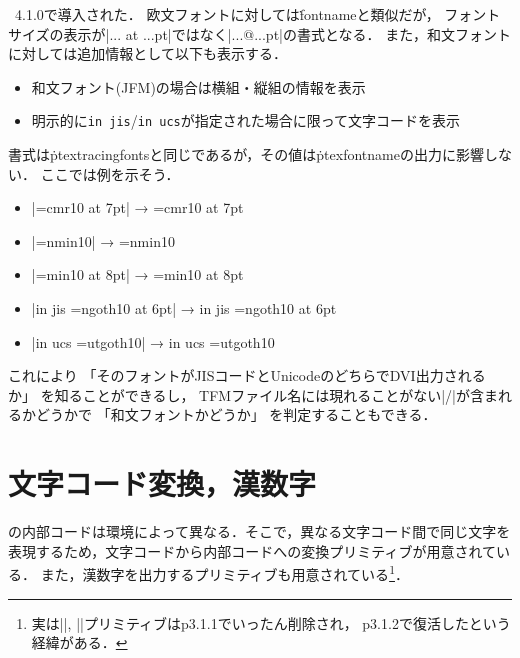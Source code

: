 \documentclass[a4paper,11pt,nomag,dvipdfmx]{jsarticle}
\def\code#1{\texttt{#1}}
\begin{document}
\begin{cslist}
\csitem[\.{ptexfontname}]
  \pTeX~4.1.0で導入された．
  欧文フォントに対しては\.{fontname}と類似だが，
  フォントサイズの表示が|... at ...pt|ではなく|...@...pt|の書式となる．
  また，和文フォントに対しては追加情報として以下も表示する．
   \begin{itemize}
    \item 和文フォント(JFM)の場合は横組・縦組の情報を表示
    \item 明示的に\verb+in jis+/\verb+in ucs+が指定された場合に限って文字コードを表示
   \end{itemize}
  書式は\.{ptextracingfonts}と同じであるが，その値は\.{ptexfontname}の出力に影響しない．
  ここでは例を示そう．
 \begin{itemize}
  \item |\font\x=cmr10 at 7pt| → {\font\x=cmr10 at 7pt \code{\ptexfontname\x}}
  \item |\font\x=nmin10| → {\font\x=nmin10 \code{\ptexfontname\x}}
  \item |\font\x=min10 at 8pt| → {\font\x=min10 at 8pt \code{\ptexfontname\x}}
  \item |\font in jis \x=ngoth10 at 6pt| → {\font in jis \x=ngoth10 at 6pt \code{\ptexfontname\x}}
  \item |\font in ucs \x=utgoth10| → {\font in ucs \x=utgoth10 \code{\ptexfontname\x}}
 \end{itemize}
  これにより
  「そのフォントがJISコードとUnicodeのどちらでDVI出力されるか」
  を知ることができるし，
  TFMファイル名には現れることがない|/|が含まれるかどうかで
  「和文フォントかどうか」
  を判定することもできる．
\end{cslist}

\section{文字コード変換，漢数字}

\pTeX の内部コードは環境によって異なる．そこで，異なる文字コード間で同じ文字を
表現するため，文字コードから内部コードへの変換プリミティブが用意されている．
また，漢数字を出力するプリミティブも用意されている\footnote{%
実は|\kansuji|, |\kansujichar|プリミティブはp3.1.1でいったん削除され，
p3.1.2で復活したという経緯がある．}．
\end{document}
